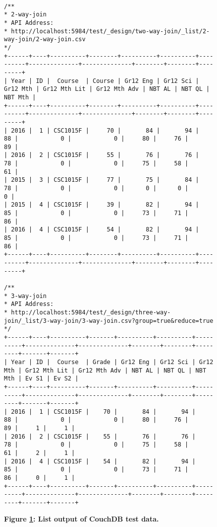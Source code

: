 \begin{figure}[H]
    \centering
    \begin{mdframed}[rightline=false,leftline=false]
        \centering
        \begin{BVerbatim}[fontsize=\tiny]

/**
* 2-way-join
* API Address:
* http://localhost:5984/test/_design/two-way-join/_list/2-way-join/2-way-join.csv
*/
+------+----+----------+--------+----------+----------+----------+--------------+--------------+--------+--------+---------+
| Year | ID |  Course  | Course | Gr12 Eng | Gr12 Sci | Gr12 Mth | Gr12 Mth Lit | Gr12 Mth Adv | NBT AL | NBT QL | NBT Mth |
+------+----+----------+--------+----------+----------+----------+--------------+--------------+--------+--------+---------+
| 2016 |  1 | CSC1015F |     70 |       84 |       94 |       88 |            0 |            0 |     80 |     76 |      89 |
| 2016 |  2 | CSC1015F |     55 |       76 |       76 |       78 |            0 |            0 |     75 |     58 |      61 |
| 2015 |  3 | CSC1015F |     77 |       75 |       84 |       78 |            0 |            0 |      0 |      0 |       0 |
| 2015 |  4 | CSC1015F |     39 |       82 |       94 |       85 |            0 |            0 |     73 |     71 |      86 |
| 2016 |  4 | CSC1015F |     54 |       82 |       94 |       85 |            0 |            0 |     73 |     71 |      86 |
+------+----+----------+--------+----------+----------+----------+--------------+--------------+--------+--------+---------+

/**
* 3-way-join
* API Address:
* http://localhost:5984/test/_design/three-way-join/_list/3-way-join/3-way-join.csv?group=true&reduce=true
*/
+------+----+----------+-------+----------+----------+----------+--------------+--------------+--------+--------+---------+-------+-------+
| Year | ID |  Course  | Grade | Gr12 Eng | Gr12 Sci | Gr12 Mth | Gr12 Mth Lit | Gr12 Mth Adv | NBT AL | NBT QL | NBT Mth | Ev S1 | Ev S2 |
+------+----+----------+-------+----------+----------+----------+--------------+--------------+--------+--------+---------+-------+-------+
| 2016 |  1 | CSC1015F |    70 |       84 |       94 |       88 |            0 |            0 |     80 |     76 |      89 |     1 |     1 |
| 2016 |  2 | CSC1015F |    55 |       76 |       76 |       78 |            0 |            0 |     75 |     58 |      61 |     2 |     1 |
| 2016 |  4 | CSC1015F |    54 |       82 |       94 |       85 |            0 |            0 |     73 |     71 |      86 |     0 |     1 |
+------+----+----------+-------+----------+----------+----------+--------------+--------------+--------+--------+---------+-------+-------+

        \end{BVerbatim}
    \end{mdframed}
    \caption[CouchDB List output]{\textbf{Figure \ref{fig-test-list-output}: List output of CouchDB test data.}}
    \label{fig-test-list-output}
\end{figure}
